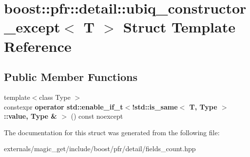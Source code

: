 \hypertarget{structboost_1_1pfr_1_1detail_1_1ubiq__constructor__except}{}\section{boost\+:\+:pfr\+:\+:detail\+:\+:ubiq\+\_\+constructor\+\_\+except$<$ T $>$ Struct Template Reference}
\label{structboost_1_1pfr_1_1detail_1_1ubiq__constructor__except}
\subsection*{Public Member Functions}
\begin{DoxyCompactItemize}
\item 
\mbox{\label{structboost_1_1pfr_1_1detail_1_1ubiq__constructor__except_a55b5e925a37eebded8675752f0d5e9ad}} 
{\footnotesize template$<$class Type $>$ }\\constexpr {\bfseries operator std\+::enable\+\_\+if\+\_\+t$<$!std\+::is\+\_\+same$<$ T, Type $>$\+::value, Type \& $>$} () const noexcept
\end{DoxyCompactItemize}


The documentation for this struct was generated from the following file\+:\begin{DoxyCompactItemize}
\item 
externals/magic\+\_\+get/include/boost/pfr/detail/fields\+\_\+count.\+hpp\end{DoxyCompactItemize}
